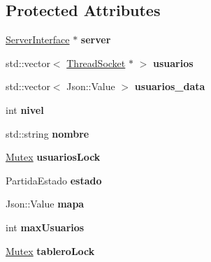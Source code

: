 \subsection*{Protected Attributes}
\begin{DoxyCompactItemize}
\item 
\hypertarget{classPartida_abc3809c4e626bdf312e5b16eb1bd195e}{\hyperlink{classServerInterface}{Server\-Interface} $\ast$ {\bfseries server}}\label{classPartida_abc3809c4e626bdf312e5b16eb1bd195e}

\item 
\hypertarget{classPartida_a462fceca3e2eb8254f06b1d13333a11b}{std\-::vector$<$ \hyperlink{classThreadSocket}{Thread\-Socket} $\ast$ $>$ {\bfseries usuarios}}\label{classPartida_a462fceca3e2eb8254f06b1d13333a11b}

\item 
\hypertarget{classPartida_a3a4835c9999f5eac84192ff85b46d1ad}{std\-::vector$<$ Json\-::\-Value $>$ {\bfseries usuarios\-\_\-data}}\label{classPartida_a3a4835c9999f5eac84192ff85b46d1ad}

\item 
\hypertarget{classPartida_a21aa4e691f8b813a6fb3f79bb7b22a1d}{int {\bfseries nivel}}\label{classPartida_a21aa4e691f8b813a6fb3f79bb7b22a1d}

\item 
\hypertarget{classPartida_a80eb2d37509b6783a1a024c87be409c6}{std\-::string {\bfseries nombre}}\label{classPartida_a80eb2d37509b6783a1a024c87be409c6}

\item 
\hypertarget{classPartida_afb0345f9fa6b54ac3ad4014537dee53d}{\hyperlink{classMutex}{Mutex} {\bfseries usuarios\-Lock}}\label{classPartida_afb0345f9fa6b54ac3ad4014537dee53d}

\item 
\hypertarget{classPartida_a37dc0887b6d2afcbab3373c0dc1f9fcb}{Partida\-Estado {\bfseries estado}}\label{classPartida_a37dc0887b6d2afcbab3373c0dc1f9fcb}

\item 
\hypertarget{classPartida_a514d8e0bcb39b2ae8faae11e3b1ea0e2}{Json\-::\-Value {\bfseries mapa}}\label{classPartida_a514d8e0bcb39b2ae8faae11e3b1ea0e2}

\item 
\hypertarget{classPartida_a0bffb19c265fdc9c973399272719c4d8}{int {\bfseries max\-Usuarios}}\label{classPartida_a0bffb19c265fdc9c973399272719c4d8}

\item 
\hypertarget{classPartida_ac9fac6752ce5e3aa9c8f7ce795911045}{\hyperlink{classMutex}{Mutex} {\bfseries tablero\-Lock}}\label{classPartida_ac9fac6752ce5e3aa9c8f7ce795911045}


\end{DoxyCompactItemize}
